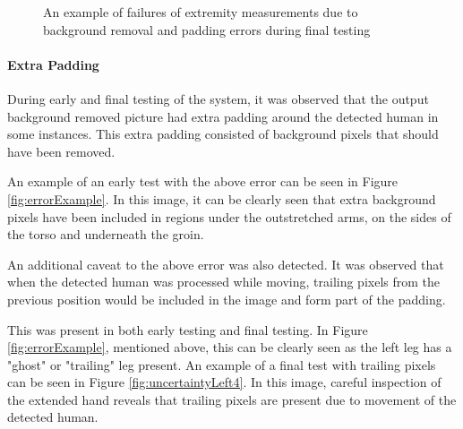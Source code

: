 \begin{figure}[ht]
	\centering
	{%
		\setlength{\fboxsep}{0pt}%
		\setlength{\fboxrule}{0.5pt}%
		}
	\caption{An example of failures of extremity measurements due to background removal and padding errors during final testing}
	\label{fig:volunteer1Back}
\end{figure}

\paragraph{Extra Padding}
During early and final testing of the system, it was observed that the output background removed picture had extra padding around the detected human in some instances. This extra padding consisted of background pixels that should have been removed. 

An example of an early test with the above error can be seen in Figure \ref{fig:errorExample}. In this image, it can be clearly seen that extra background pixels have been included in regions under the outstretched arms, on the sides of the torso and underneath the groin. 

An additional caveat to the above error was also detected. It was observed that when the detected human was processed while moving, trailing pixels from the previous position would be included in the image and form part of the padding.

This was present in both early testing and final testing. In Figure \ref{fig:errorExample}, mentioned above, this can be clearly seen as the left leg has a "ghost" or "trailing" leg present. An example of a final test with trailing pixels can be seen in Figure \ref{fig:uncertaintyLeft4}. In this image, careful inspection of the extended hand reveals that trailing pixels are present due to movement of the detected human.

